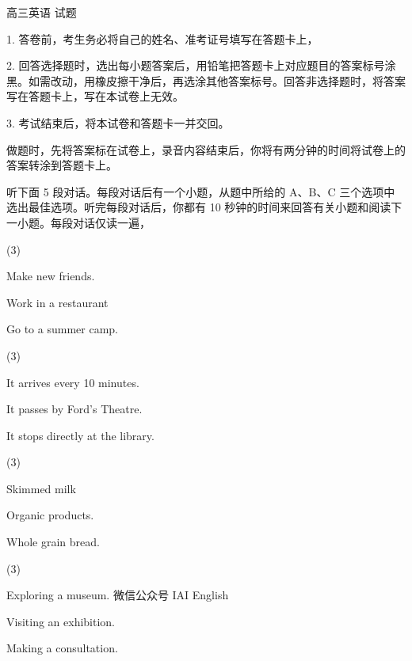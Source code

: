 \documentclass{英语试卷}
\begin{document}
\par 高三英语 试题\par
\begin{notice}
\par 1. 答卷前，考生务必将自己的姓名、准考证号填写在答题卡上，\par
\par 2. 回答选择题时，选出每小题答案后，用铅笔把答题卡上对应题目的答案标号涂黑。如需改动，用橡皮擦干净后，再选涂其他答案标号。回答非选择题时，将答案写在答题卡上，写在本试卷上无效。\par
\par 3. 考试结束后，将本试卷和答题卡一并交回。\par
\end{notice}
\par 做题时，先将答案标在试卷上，录音内容结束后，你将有两分钟的时间将试卷上的答案转涂到答题卡上。\par
{}
\par 听下面 5 段对话。每段对话后有一个小题，从题中所给的 A、B、C 三个选项中选出最佳选项。听完每段对话后，你都有 10 秒钟的时间来回答有关小题和阅读下一小题。每段对话仅读一遍，\par
{}
\begin{choices}(3)
  \item Make new friends.
  \item Work in a restaurant
  \item Go to a summer camp.
\end{choices}
\begin{choices}(3)
  \item It arrives every 10 minutes.
  \item It passes by Ford's Theatre.
  \item It stops directly at the library.
\end{choices}
\begin{choices}(3)
  \item Skimmed milk
  \item Organic products.
  \item Whole grain bread.
\end{choices}
\begin{choices}(3)
  \item Exploring a museum. 微信公众号 IAI English
  \item Visiting an exhibition.
  \item Making a consultation.
\end{choices}
\end{document}
